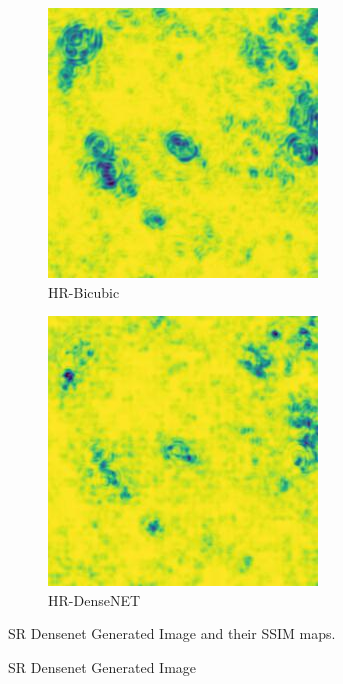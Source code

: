 \begin{figure}[H]
  \begin{subfigure}[b]{0.275\textwidth}
    \includegraphics[width=\textwidth]{Chapter7/SSIM_bicubic_9.jpg}
    \caption{HR-Bicubic}
  \end{subfigure}
  \begin{subfigure}[b]{0.275\textwidth}
    \includegraphics[width=\textwidth]{Chapter7/SSIM_densenet_9.jpg}
    \caption{HR-DenseNET}
  \end{subfigure}
    \caption{SR Densenet Generated Image}{SR Densenet Generated Image and their SSIM maps.\cite{DenseNET} \cite{SSIM}}
    \label{fig:test23}
\end{figure}

